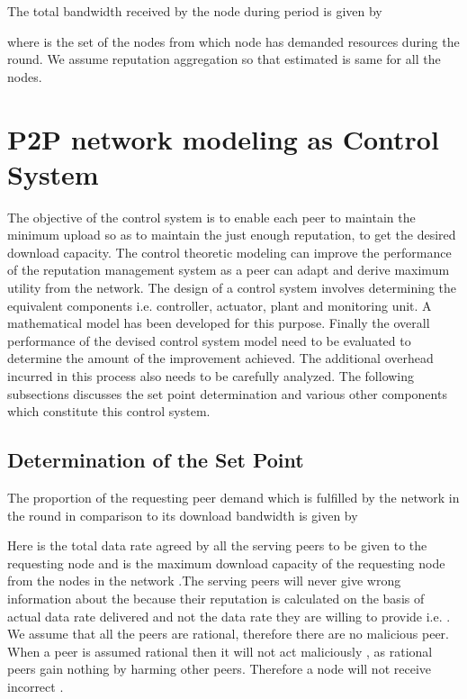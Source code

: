\documentclass[journal]{IEEEtran}
\begin{document}
The total bandwidth received by the node  during  period is given by

where  is the set of the nodes from which node  has demanded resources during the  round. We assume reputation aggregation so that  estimated is same for all the nodes.
\section{P2P network modeling as Control System}
\label{C_sys}
The objective of the control system is to enable each peer to maintain the minimum upload so as to maintain the just enough  reputation, to get the desired download capacity. The control theoretic modeling can improve the performance of the reputation management system as a peer can adapt and derive maximum utility from the network. The design of a control system  involves determining the equivalent components i.e. controller, actuator, plant and monitoring unit. A mathematical model has been developed for this purpose. Finally the overall performance of the devised control system model need to be evaluated to determine the amount of the improvement achieved. The additional overhead incurred in this process also needs to be carefully analyzed. The following subsections discusses the set point determination and  various other components which constitute this control system. 

\subsection{Determination of the Set Point}
\label{SetPoint}
The proportion of the  requesting peer  demand which is fulfilled by the network in the  round in comparison to its download bandwidth is given by 

Here   is the total data rate agreed by all the serving peers to be given to the requesting node   and   is the maximum download capacity of the requesting node  from the nodes in the network .The serving peers will never give wrong information about the  because their reputation is calculated on the basis of actual data rate delivered and not the data rate they are willing to provide i.e. . We assume that all the peers are rational, therefore there are no malicious peer. When a peer is assumed  rational then it will  not act maliciously \cite{RationalMalicious}, as rational peers gain nothing by harming other peers. Therefore a node will not receive incorrect .
\end{document}
